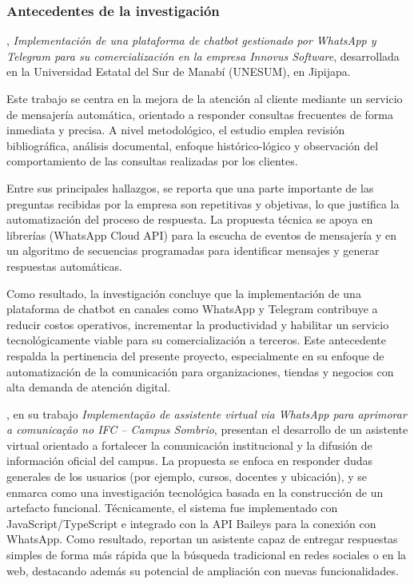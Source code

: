 \subsubsection{Antecedentes de la investigación }

\cite{linocruz2023}, \textit{Implementación de una plataforma de chatbot gestionado por WhatsApp y Telegram para su comercialización en la empresa Innovus Software}, desarrollada en la Universidad Estatal del Sur de Manabí (UNESUM), en Jipijapa.

Este trabajo se centra en la mejora de la atención al cliente mediante un servicio de mensajería automática, orientado a responder consultas frecuentes de forma inmediata y precisa. A nivel metodológico, el estudio emplea revisión bibliográfica, análisis documental, enfoque histórico-lógico y observación del comportamiento de las consultas realizadas por los clientes.

Entre sus principales hallazgos, se reporta que una parte importante de las preguntas recibidas por la empresa son repetitivas y objetivas, lo que justifica la automatización del proceso de respuesta. La propuesta técnica se apoya en librerías (WhatsApp Cloud API) para la escucha de eventos de mensajería y en un algoritmo de secuencias programadas para identificar mensajes y generar respuestas automáticas.

Como resultado, la investigación concluye que la implementación de una plataforma de chatbot en canales como WhatsApp y Telegram contribuye a reducir costos operativos, incrementar la productividad y habilitar un servicio tecnológicamente viable para su comercialización a terceros. Este antecedente respalda la pertinencia del presente proyecto, especialmente en su enfoque de automatización de la comunicación para organizaciones, tiendas y negocios con alta demanda de atención digital.

\cite{vargasbraga_ifc}, en su trabajo \textit{Implementa{\c{c}}{\~a}o de assistente virtual via WhatsApp para aprimorar a comunica{\c{c}}{\~a}o no IFC -- Campus Sombrio}, presentan el desarrollo de un asistente virtual orientado a fortalecer la comunicaci{\'o}n institucional y la difusi{\'o}n de informaci{\'o}n oficial del campus. La propuesta se enfoca en responder dudas generales de los usuarios (por ejemplo, cursos, docentes y ubicaci{\'o}n), y se enmarca como una investigaci{\'o}n tecnol{\'o}gica basada en la construcci{\'o}n de un artefacto funcional. T{\'e}cnicamente, el sistema fue implementado con JavaScript/TypeScript e integrado con la API Baileys para la conexi{\'o}n con WhatsApp. Como resultado, reportan un asistente capaz de entregar respuestas simples de forma m{\'a}s r{\'a}pida que la b{\'u}squeda tradicional en redes sociales o en la web, destacando adem{\'a}s su potencial de ampliaci{\'o}n con nuevas funcionalidades.


